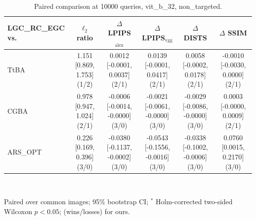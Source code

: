 \begin{table}[t]
\centering\footnotesize
\caption{Paired comparison at 10000 queries, vit\_b\_32, non\_targeted.}
\begin{tabular}{lccccc}
\toprule
LGC\_RC\_EGC vs. & $\ell_2$ ratio & $\Delta$ LPIPS$_{\mathrm{alex}}$ & $\Delta$ LPIPS$_{\mathrm{vgg}}$ & $\Delta$ DISTS & $\Delta$ SSIM \\
\midrule
TtBA & 1.151 [0.869, 1.753] (1/2) & 0.0012 [-0.0001, 0.0037] (2/1) & 0.0139 [-0.0001, 0.0417] (2/1) & 0.0058 [-0.0002, 0.0178] (2/1) & -0.0010 [-0.0030, 0.0000] (2/1) \\
CGBA & 0.978 [0.947, 1.024] (2/1) & -0.0006 [-0.0014, -0.0000] (3/0) & -0.0021 [-0.0061, -0.0000] (3/0) & -0.0029 [-0.0086, -0.0000] (3/0) & 0.0003 [-0.0000, 0.0009] (2/1) \\
ARS\_OPT & 0.226 [0.169, 0.396] (3/0) & -0.0380 [-0.1137, -0.0002] (3/0) & -0.0543 [-0.1556, -0.0016] (3/0) & -0.0338 [-0.1002, -0.0006] (3/0) & 0.0760 [0.0015, 0.2170] (3/0) \\
\bottomrule
\end{tabular}
\\[2pt]\parbox{\linewidth}{\scriptsize Paired over common images; 95\% bootstrap CI; $^{*}$ Holm-corrected two-sided Wilcoxon $p<0.05$; (wins/losses) for ours.}
\end{table}
